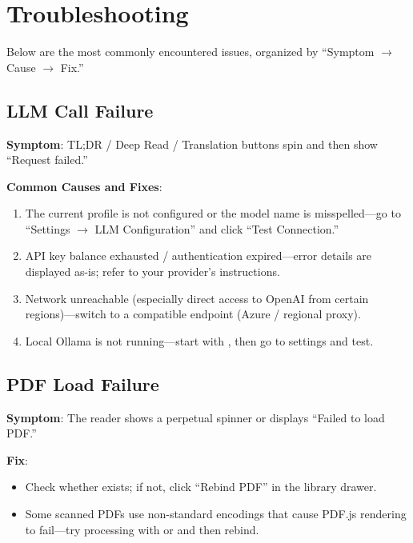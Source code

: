 \chapter{Troubleshooting}
\label{ch:troubleshoot}

Below are the most commonly encountered issues, organized by ``Symptom $\rightarrow$
Cause $\rightarrow$ Fix.''

\section{LLM Call Failure}

\textbf{Symptom}: TL;DR / Deep Read / Translation buttons spin and then show
``Request failed.''

\textbf{Common Causes and Fixes}:

\begin{enumerate}
  \item The current profile is not configured or the model name is misspelled---go to
    ``Settings $\rightarrow$ LLM Configuration'' and click ``Test Connection.''
  \item API key balance exhausted / authentication expired---error details are displayed
    as-is; refer to your provider's instructions.
  \item Network unreachable (especially direct access to OpenAI from certain regions)---switch
    to a compatible endpoint (Azure / regional proxy).
  \item Local Ollama is not running---start with , then go to settings
    and test.
\end{enumerate}

\section{PDF Load Failure}

\textbf{Symptom}: The reader shows a perpetual spinner or displays ``Failed to load PDF.''

\textbf{Fix}:

\begin{itemize}
  \item Check whether  exists; if not, click ``Rebind PDF''
    in the library drawer.
  \item Some scanned PDFs use non-standard encodings that cause PDF.js rendering to
    fail---try processing with  or  and then rebind.
\end{itemize}

